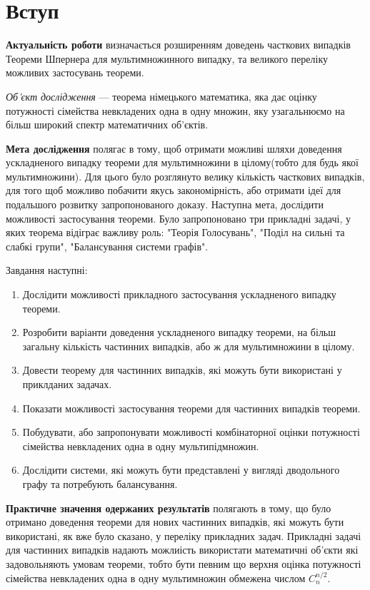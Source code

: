 \chapter*{Вступ}

\textbf{Актуальність роботи} визначається розширенням доведень часткових випадків Теореми Шпернера для мультимножинного випадку, та великого переліку можливих застосувань теореми.

\textit{Об’єкт дослідження} --- теорема німецького математика, яка дає оцінку потужності сімейства невкладених одна в одну множин, яку узагальнюємо на більш широкий спектр математичних об'єктів.

\textbf{Мета дослідження} полягає в тому, щоб отримати можливі шляхи доведення ускладненого випадку теореми для мультимножини в цілому(тобто для будь якої мультимножини). Для цього було розглянуто велику кількість часткових випадків, для того щоб можливо побачити якусь закономірність, або отримати ідеї для подальшого розвитку запропонованого доказу. Наступна мета, дослідити можливості застосування теореми. Було запропоновано три прикладні задачі, у яких теорема відіграє важливу роль: "Теорія Голосувань", "Поділ на сильні та слабкі групи", "Балансування системи графів".

Завдання наступні:
\begin{enumerate}
  \item
    Дослідити можливості прикладного застосування ускладненого випадку теореми.
  \item
    Розробити варіанти доведення ускладненого випадку теореми, на більш загальну кількість частинних випадків, або ж для мультимножини в цілому.
   \item
   	Довести теорему для частинних випадків, які можуть бути використані у приклданих задачах.
   \item
   	Показати можливості застосування теореми для частинних випадків теореми.
   \item
    Побудувати, або запропонувати можливості комбінаторної оцінки потужності сімейства невкладених одна в одну мультипідмножин.
    \item
     Дослідити системи, які можуть бути представлені у вигляді дводольного графу та потребують балансування.
\end{enumerate}

\textbf{Практичне значення одержаних результатів} полягають в тому, що було отримано доведення теореми для нових частинних випадків, які можуть бути використані, як вже було сказано, у переліку прикладних задач. Прикладні задачі для частинних випадків надають можлиість використати математичні об'єкти які задовольняють умовам теореми, тобто бути певним що верхня оцінка потужності сімейства невкладених одна в одну мультимножин обмежена числом $C_n^{n/2}$.


